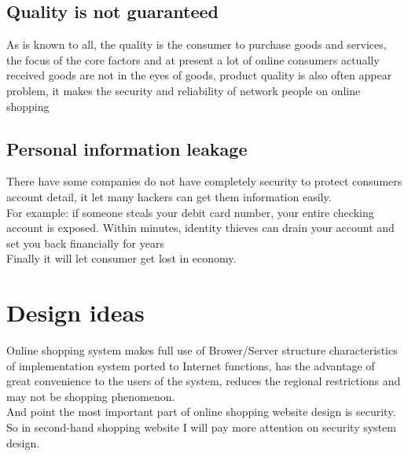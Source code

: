 \subsection{Quality is not guaranteed}
As is known to all, the quality is the consumer to purchase goods and services, the focus of the core factors and at present a lot of online consumers actually received goods are not in the eyes of goods, product quality is also often appear problem, it makes the security and reliability of network people on online shopping
\\
\subsection{Personal information leakage}
There have some companies do not have completely security to protect consumers account detail, it let many hackers can get them information easily.\\ 
For example:  if someone steals your debit card number, your entire checking account is exposed. Within minutes, identity thieves can drain your account and set you back financially for years \\
Finally it will let consumer get lost in economy.
\\
\section{Design ideas}
Online shopping system makes full use of Brower/Server structure characteristics of implementation system ported to Internet functions, has the advantage of great convenience to the users of the system, reduces the regional restrictions and may not be shopping phenomenon.\\
And point the most important part of online shopping website design is security. So in second-hand shopping website I will pay more attention on security system design.\\ 
\\